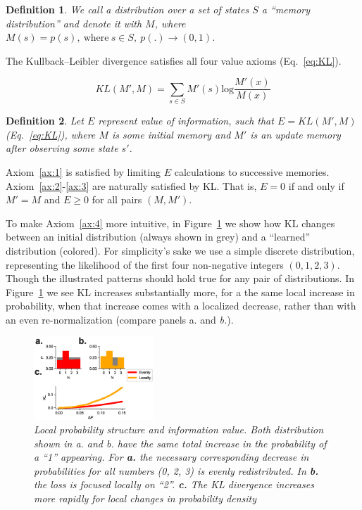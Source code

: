 \documentclass[9pt,twocolumn,twoside]{pnas-new}
\newtheorem{definition}{Definition}
\begin{document}
\begin{definition}
    We call a distribution over a set of states $S$ a ``memory distribution'' and denote it with $M$, where $M(s) = p(s), \ \text{where} \ s \in S, \ p(.) \rightarrow (0, 1)$.
\end{definition}

The Kullback--Leibler divergence satisfies all four value axioms (Eq.~\ref{eq:KL}). 

\begin{equation}
    KL(M', M) = \sum_{s \in S} M'(s) \text{log} \frac{M'(x)}{M(x)} 
    \label{eq:KL}
\end{equation}

\begin{definition}
    Let $E$ represent value of information, such that $E = KL(M', M)$ (Eq.~\ref{eq:KL}), where $M$ is some initial memory and $M'$ is an update memory after observing some state $s'$.
\end{definition}

Axiom~\ref{ax:1} is satisfied by limiting $E$ calculations to successive memories. Axiom~\ref{ax:2}-\ref{ax:3} are naturally satisfied by KL. That is, $E = 0$ if and only if $M' = M$ and $E \geq 0$ for all pairs $(M, M')$.

To make Axiom~\ref{ax:4} more intuitive, in Figure~\ref{fig:metrics_specifity} we show how KL changes between an initial distribution (always shown in grey) and a ``learned'' distribution (colored). For simplicity's sake we use a simple discrete distribution, representing the likelihood of the first four non-negative integers $(0,1,2,3)$. Though the illustrated patterns should hold true for any pair of distributions. In Figure~\ref{fig:metrics_specifity} we see KL increases substantially more, for a the same local increase in probability, when that increase comes with a localized decrease, rather than with an even re-normalization (compare panels \textit{}{a.} and \textit{b.}).

\begin{figure}
\includegraphics[width=0.4\textwidth]{figures/metrics_specifity.eps}
\caption{
\textit{Local probability structure and information value. Both distribution shown in a. and b. have the same total increase in the probability of a ``1'' appearing.
For \textbf{a.}  the necessary corresponding decrease in probabilities for all numbers (0, 2, 3) is evenly redistributed.
In \textbf{b.} the loss is focused locally on ``2''. 
\textbf{c.} The KL divergence increases more rapidly for local changes in probability density}}
\label{fig:metrics_specifity}
\end{figure}
\end{document}
